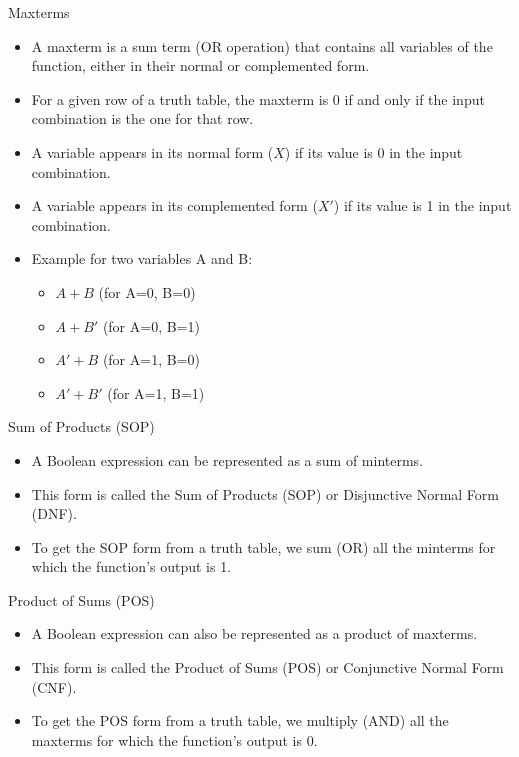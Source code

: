 \documentclass{beamer}
\begin{document}
\begin{frame}{Maxterms}
    \begin{itemize}
        \item A maxterm is a sum term (OR operation) that contains all variables
        of the function, either in their normal or complemented form.
        \item For a given row of a truth table, the maxterm is 0 if and only if
        the input combination is the one for that row.
        \item A variable appears in its normal form ($X$) if its value is 0 in
        the input combination.
        \item A variable appears in its complemented form ($X'$) if its value is
        1 in the input combination.
        \item Example for two variables A and B:
            \begin{itemize}
                \item $A+B$ (for A=0, B=0)
                \item $A+B'$ (for A=0, B=1)
                \item $A'+B$ (for A=1, B=0)
                \item $A'+B'$ (for A=1, B=1)
            \end{itemize}
    \end{itemize}
\end{frame}

\begin{frame}{Sum of Products (SOP)}
    \begin{itemize}
        \item A Boolean expression can be represented as a sum of minterms.
        \item This form is called the Sum of Products (SOP) or Disjunctive
        Normal Form (DNF).
        \item To get the SOP form from a truth table, we sum (OR) all the
        minterms for which the function's output is 1.
    \end{itemize}
\end{frame}

\begin{frame}{Product of Sums (POS)}
    \begin{itemize}
        \item A Boolean expression can also be represented as a product of
        maxterms.
        \item This form is called the Product of Sums (POS) or Conjunctive
        Normal Form (CNF).
        \item To get the POS form from a truth table, we multiply (AND) all the
        maxterms for which the function's output is 0.
    \end{itemize}
\end{frame}
\end{document}
